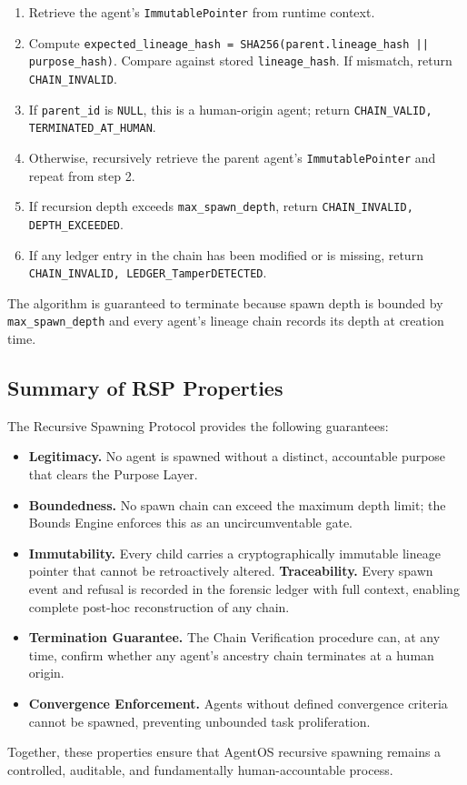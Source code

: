 \begin{enumerate}
    \item Retrieve the agent's \texttt{ImmutablePointer} from runtime context.
    \item Compute \texttt{expected\_lineage\_hash = SHA256(parent.lineage\_hash || purpose\_hash)}. Compare against stored \texttt{lineage\_hash}. If mismatch, return \texttt{CHAIN\_INVALID}.
    \item If \texttt{parent\_id} is \texttt{NULL}, this is a human-origin agent; return \texttt{CHAIN\_VALID, TERMINATED\_AT\_HUMAN}.
    \item Otherwise, recursively retrieve the parent agent's \texttt{ImmutablePointer} and repeat from step 2.
    \item If recursion depth exceeds \texttt{max\_spawn\_depth}, return \texttt{CHAIN\_INVALID, DEPTH\_EXCEEDED}.
    \item If any ledger entry in the chain has been modified or is missing, return \texttt{CHAIN\_INVALID, LEDGER\_TamperDETECTED}.
\end{enumerate}

The algorithm is guaranteed to terminate because spawn depth is bounded by \texttt{max\_spawn\_depth} and every agent's lineage chain records its depth at creation time.

\subsection{Summary of RSP Properties}
\label{subsection:rsp-properties}

The Recursive Spawning Protocol provides the following guarantees:

\begin{itemize}
    \item \textbf{Legitimacy.} No agent is spawned without a distinct, accountable purpose that clears the Purpose Layer.
    \item \textbf{Boundedness.} No spawn chain can exceed the maximum depth limit; the Bounds Engine enforces this as an uncircumventable gate.
    \item \textbf{Immutability.} Every child carries a cryptographically immutable lineage pointer that cannot be retroactively altered.
    \textbf{Traceability.} Every spawn event and refusal is recorded in the forensic ledger with full context, enabling complete post-hoc reconstruction of any chain.
    \item \textbf{Termination Guarantee.} The Chain Verification procedure can, at any time, confirm whether any agent's ancestry chain terminates at a human origin.
    \item \textbf{Convergence Enforcement.} Agents without defined convergence criteria cannot be spawned, preventing unbounded task proliferation.
\end{itemize}

Together, these properties ensure that AgentOS recursive spawning remains a controlled, auditable, and fundamentally human-accountable process.